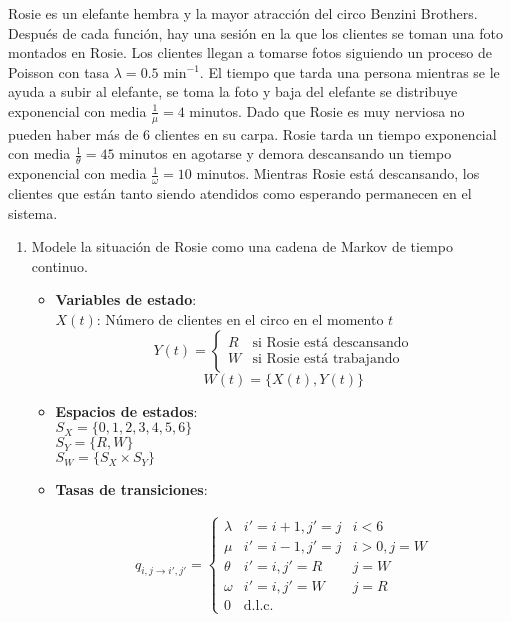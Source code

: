 
Rosie es un elefante hembra y la mayor atracción del circo Benzini Brothers. Después de cada función, hay una sesión en la que los clientes se toman una foto montados en Rosie. Los clientes llegan a tomarse fotos siguiendo un proceso de Poisson con tasa $\lambda = 0.5 \text{ min}^{-1}$. El tiempo que tarda una persona mientras se le ayuda a subir al elefante, se toma la foto y baja del elefante se distribuye exponencial con media $\frac{1}{\mu} = 4$ minutos. Dado que Rosie es muy nerviosa no pueden haber más de 6 clientes en su carpa. Rosie tarda un tiempo exponencial con media $\frac{1}{\theta} = 45$ minutos en agotarse y demora descansando un tiempo exponencial con media $\frac{1}{\omega} = 10$ minutos. Mientras Rosie está descansando, los clientes que están tanto siendo atendidos como esperando permanecen en el sistema.

\begin{enumerate}
\item Modele la situación de Rosie como una cadena de Markov de tiempo continuo. \

    \begin{itemize}
    	\item[] \textbf{Variables de estado}:\\
    	$X(t)$: Número de clientes en el circo en el momento $t$
            \[Y(t) = \begin{cases} 
                R & \text{si Rosie está descansando} \\
                W & \text{si Rosie está trabajando} 
                \end{cases}
            \]
            \[ W(t) = \{ X(t), Y(t) \} \]
            
    		
    	\item[] \textbf{Espacios de estados}:\\
    	$S_X = \{0,1,2,3,4,5,6\}$ \\
            $S_Y = \{R,W\}$ \\
            $S_W = \{S_X \times S_Y\}$ \\

    	\item[] \textbf{Tasas de transiciones}:\

            \begin{align*}
             q_{{i,j} \to {i',j'}} = \left\{ 
                \begin{array}{llll}
                    \lambda    &  i'=i+1, j'=j & i<6 \\ 
                    \mu    &  i'=i-1, j'=j & i>0, j=W \\ 
                    \theta    &  i'=i, j'=R & j=W \\ 
                    \omega    &  i'=i, j'=W & j=R \\
                    0 & \text{d.l.c.}
                \end{array} \right.
            \end{align*}

    
    \end{itemize}



\end{enumerate}
